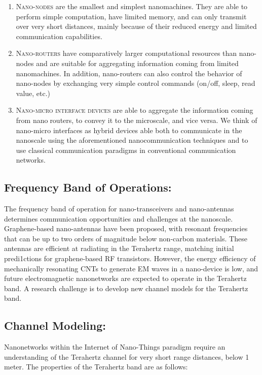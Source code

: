 \documentclass{report}
\begin{document}
    \begin{enumerate}
        \item \textsc{Nano-nodes} are the smallest and simplest nanomachines. They are able to perform simple computation, have limited memory, and can only transmit over very short distances, mainly because of their reduced energy and limited communication capabilities.
        
        \item \textsc{Nano-routers} have comparatively larger computational resources than nano-nodes and are suitable for aggregating information coming from limited nanomachines. In addition, nano-routers can also control the behavior of nano-nodes by exchanging very simple control commands (on/off, sleep, read value, etc.)
        
        \item \textsc{Nano-micro interface devices} are able to aggregate the information coming from nanorouters, to convey it to the microscale, and vice versa. We think of nano-micro interfaces as hybrid devices able both to communicate in the nanoscale using the aforementioned nanocommunication techniques and to use classical communication paradigms in conventional communication networks.
    \end{enumerate}

\subsection*{Frequency Band of Operations:}
    The frequency band of operation for nano-transceivers and nano-antennas determines communication opportunities and challenges at the nanoscale. Graphene-based nano-antennas have been proposed, with resonant frequencies that can be up to two orders of magnitude below non-carbon materials. These antennas are efficient at radiating in the Terahertz range, matching initial predi1ctions for graphene-based RF transistors. However, the energy efficiency of mechanically resonating CNTs to generate EM waves in a nano-device is low, and future electromagnetic nanonetworks are expected to operate in the Terahertz band. A research challenge is to develop new channel models for the Terahertz band.

\subsection*{Channel Modeling:}

    Nanonetworks within the Internet of Nano-Things paradigm require an understanding of the Terahertz channel for very short range distances, below 1 meter. The properties of the Terahertz band are as follows:
\end{document}
